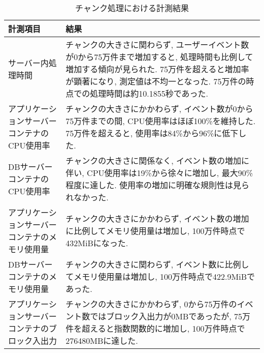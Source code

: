 \documentclass[../../../main]{subfiles}
\begin{document}
    \begin{table}[H]
        \centering
        \caption{チャンク処理における計測結果}
        \label{tab:result-chunk}
        \begin{tabular}{|p{4cm}|p{10cm}|}
            \hline
            \textbf{計測項目}                & \textbf{結果}                                                                                                                                                                \\ \hline
            サーバー内処理時間                    & チャンクの大きさに関わらず, ユーザーイベント数が0から75万件まで増加すると, 処理時間も比例して増加する傾向が見られた. 75万件を超えると増加率が顕著になり, 測定値は不均一となった. 75万件の時点での処理時間は約10.1855秒であった.                                                     \\ \hline
            アプリケーションサーバーコンテナのCPU使用率      & チャンクの大きさにかかわらず, イベント数が0から75万件までの間, CPU使用率はほぼ100\%を維持した. 75万件を超えると, 使用率は84\%から96\%に低下した.                                                                                         \\ \hline
            DBサーバーコンテナのCPU使用率            & チャンクの大きさに関係なく, イベント数の増加に伴い, CPU使用率は19\%から徐々に増加し, 最大90\%程度に達した. 使用率の増加に明確な規則性は見られなかった.                                                                                           \\ \hline
            アプリケーションサーバーコンテナのメモリ使用量      & チャンクの大きさにかかわらず, イベント数の増加に比例してメモリ使用量は増加し, 100万件時点で432MiBになった.                                                                                                                  \\ \hline
            DBサーバーコンテナのメモリ使用量            & チャンクの大きさに関わらず, イベント数に比例してメモリ使用量は増加し, 100万件時点で422.9MiBであった.                                                                                                                    \\ \hline
            アプリケーションサーバーコンテナのブロック入出力     & チャンクの大きさにかかわらず, 0から75万件のイベント数ではブロック入出力が0MBであったが, 75万件を超えると指数関数的に増加し, 100万件時点で276480MBに達した.                                                                                     \\ \hline

\end{tabular}
\end{table}
\end{document}

